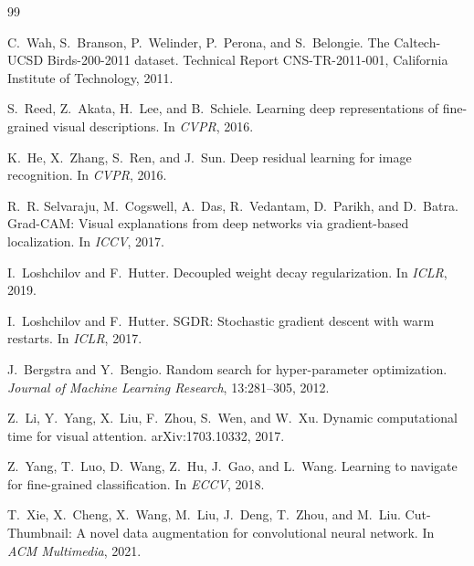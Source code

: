 \documentclass[11pt,a4paper]{article}
\begin{document}
\begin{thebibliography}{99}
\small

C.~Wah, S.~Branson, P.~Welinder, P.~Perona, and S.~Belongie.
\newblock The Caltech-UCSD Birds-200-2011 dataset.
\newblock Technical Report CNS-TR-2011-001, California Institute of Technology, 2011.

S.~Reed, Z.~Akata, H.~Lee, and B.~Schiele.
\newblock Learning deep representations of fine-grained visual descriptions.
\newblock In \emph{CVPR}, 2016.

K.~He, X.~Zhang, S.~Ren, and J.~Sun.
\newblock Deep residual learning for image recognition.
\newblock In \emph{CVPR}, 2016.

R.~R. Selvaraju, M.~Cogswell, A.~Das, R.~Vedantam, D.~Parikh, and D.~Batra.
\newblock Grad-CAM: Visual explanations from deep networks via gradient-based localization.
\newblock In \emph{ICCV}, 2017.

I.~Loshchilov and F.~Hutter.
\newblock Decoupled weight decay regularization.
\newblock In \emph{ICLR}, 2019.

I.~Loshchilov and F.~Hutter.
\newblock SGDR: Stochastic gradient descent with warm restarts.
\newblock In \emph{ICLR}, 2017.

J.~Bergstra and Y.~Bengio.
\newblock Random search for hyper-parameter optimization.
\newblock \emph{Journal of Machine Learning Research}, 13:281--305, 2012.

Z.~Li, Y.~Yang, X.~Liu, F.~Zhou, S.~Wen, and W.~Xu.
\newblock Dynamic computational time for visual attention.
\newblock arXiv:1703.10332, 2017.

Z.~Yang, T.~Luo, D.~Wang, Z.~Hu, J.~Gao, and L.~Wang.
\newblock Learning to navigate for fine-grained classification.
\newblock In \emph{ECCV}, 2018.

T.~Xie, X.~Cheng, X.~Wang, M.~Liu, J.~Deng, T.~Zhou, and M.~Liu.
\newblock Cut-Thumbnail: A novel data augmentation for convolutional neural network.
\newblock In \emph{ACM Multimedia}, 2021.

\end{thebibliography}
\end{document}
